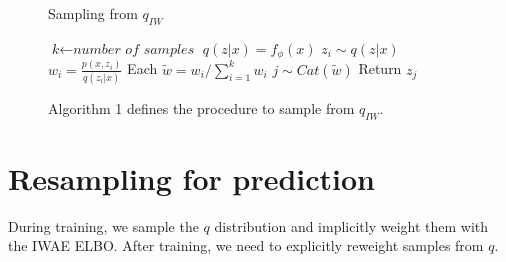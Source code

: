\documentclass{article} %
\begin{document}
\begin{figure*}[t]
\centering
\begin{centering}
\begin{minipage}[t]{0.49\columnwidth}
\begin{algorithm}[H]
\caption{Sampling from $q_{IW}$}\label{algo1}
\begin{algorithmic}[1]
    \State $\textit{k} \gets \textit{number of samples}$
    \State $q(z|x) = f_\phi(x)$
        \State $z_i \sim q(z|x)$
        \State $w_i = \frac{p(x,z_i)}{q(z_i|x)}$
    \EndFor    
    \State Each $\tilde w = w_i/\sum_{i=1}^{k} w_i$
    \State $j \sim Cat(\tilde{w})$
    \State Return $z_j$
\end{algorithmic}
\end{algorithm}
\end{minipage}
\end{centering}

\hfill
\caption{Algorithm 1 defines the procedure to sample from $q_{IW}$.
}
\end{figure*}





\section{Resampling for prediction}
During training, we sample the $q$ distribution and implicitly weight them with the IWAE ELBO. After training, we need to explicitly reweight samples from $q$.
\end{document}
